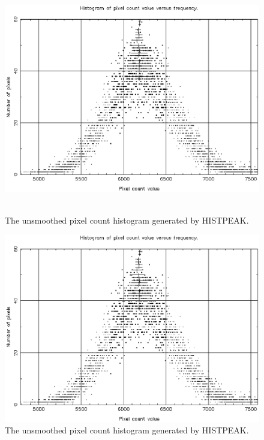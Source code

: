 \documentclass[twoside,11pt]{article}
\newenvironment{latexonly}{}{}
\begin{document}
\begin{latexonly}
\begin{figure}[htlb]
\centering
\includegraphics[width=151mm,height=100mm]{sun180_diag1.eps}
\caption{The unsmoothed pixel count histogram generated by HISTPEAK.}
\end{figure}
\end{latexonly}
\begin{htmlonly}
\begin{figure}[htlb]
\centering
\includegraphics{sun180_diag1.eps}
\caption{The unsmoothed pixel count histogram generated by HISTPEAK.}
\end{figure}
\end{htmlonly}
\end{document}
